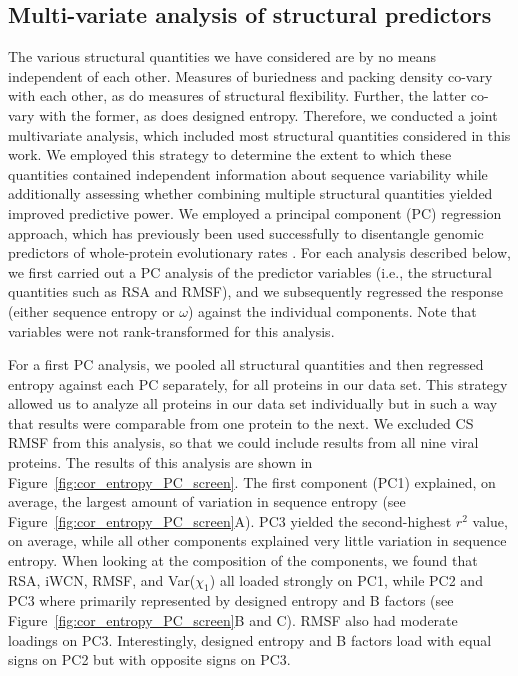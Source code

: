 \documentclass[smallextended]{svjour3}
\begin{document}
 
\subsection*{Multi-variate analysis of structural predictors}

The various structural quantities we have considered are by no means independent of each other. Measures of buriedness and packing density co-vary with each other, as do measures of structural flexibility. Further, the latter co-vary with the former, as does designed entropy. Therefore, we conducted a joint multivariate analysis, which included most structural quantities considered in this work. We employed this strategy to determine the extent to which these quantities contained independent information about sequence variability while additionally
assessing whether combining multiple structural quantities yielded improved predictive power. We employed a principal component (PC) regression approach, which has previously been used successfully to disentangle genomic predictors of whole-protein evolutionary rates \citep{Drummondetal2006,Bloometal2006}. For each analysis described below, we first carried out a PC analysis of the predictor variables (i.e., the structural quantities such as RSA and RMSF), and we subsequently regressed the response (either sequence entropy or $\omega$) against the individual components. Note that variables were not rank-transformed for this analysis.

For a first PC analysis, we pooled all structural quantities and then regressed entropy against each PC separately, for all proteins in our data set. This strategy allowed us to analyze all proteins in our data set individually but in such a way that results were comparable from one protein to the next. We excluded CS RMSF from this analysis, so that we could include results from all nine viral proteins. The results of this analysis are shown in Figure~\ref{fig:cor_entropy_PC_screen}. The first component (PC1) explained, on average, the largest amount of variation in sequence entropy (see Figure~\ref{fig:cor_entropy_PC_screen}A). PC3 yielded the second-highest $r^2$ value, on average, while all other components explained very little variation in sequence entropy. When looking at the composition of the components, we found that RSA, iWCN, RMSF, and Var($\chi_1$) all loaded strongly on PC1, while PC2 and PC3 where primarily represented by designed entropy and B factors (see Figure~\ref{fig:cor_entropy_PC_screen}B and C). RMSF also had moderate loadings on PC3. Interestingly, designed entropy and B factors load with equal signs on PC2 but with opposite signs on PC3.
\end{document}
